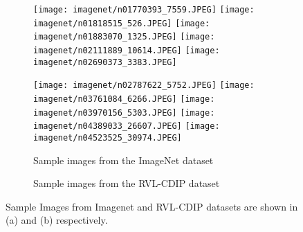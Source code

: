 \documentclass[conference]{IEEEtran}
\begin{document}
\begin{figure}
\begin{subfigure}{\linewidth}
  \centering
    \texttt{[image: imagenet/n01770393\_7559.JPEG]}
    \texttt{[image: imagenet/n01818515\_526.JPEG]}
    \texttt{[image: imagenet/n01883070\_1325.JPEG]}
    \texttt{[image: imagenet/n02111889\_10614.JPEG]}
    \texttt{[image: imagenet/n02690373\_3383.JPEG]}
\par\smallskip
    \texttt{[image: imagenet/n02787622\_5752.JPEG]}
    \texttt{[image: imagenet/n03761084\_6266.JPEG]}
    \texttt{[image: imagenet/n03970156\_5303.JPEG]}
    \texttt{[image: imagenet/n04389033\_26607.JPEG]}
    \texttt{[image: imagenet/n04523525\_30974.JPEG]}
    \caption{Sample images from the ImageNet dataset}
\end{subfigure}
 \par\medskip
\begin{subfigure}{\linewidth}
  \centering
    \caption{Sample images from the RVL-CDIP dataset}
\end{subfigure}
\caption{Sample Images from Imagenet and RVL-CDIP datasets are shown in (a) and (b) respectively. 
}
\label{fig:imagenet}
\end{figure}
\end{document}
